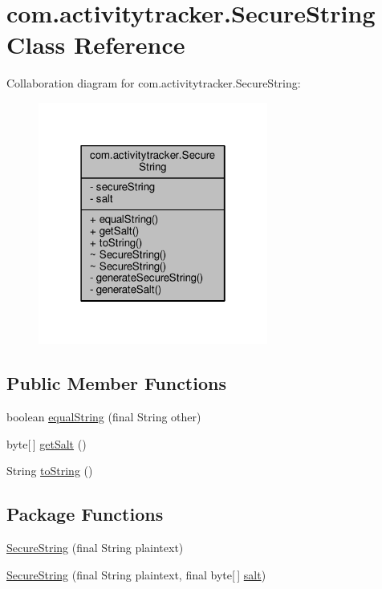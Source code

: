 \hypertarget{classcom_1_1activitytracker_1_1_secure_string}{}\section{com.\+activitytracker.\+Secure\+String Class Reference}
\label{classcom_1_1activitytracker_1_1_secure_string}


Collaboration diagram for com.\+activitytracker.\+Secure\+String\+:
\nopagebreak
\begin{figure}[H]
\begin{center}
\leavevmode
\includegraphics[width=214pt]{classcom_1_1activitytracker_1_1_secure_string__coll__graph}
\end{center}
\end{figure}
\subsection*{Public Member Functions}
\begin{DoxyCompactItemize}
\item 
boolean \hyperlink{classcom_1_1activitytracker_1_1_secure_string_a8b5c3cac74b22ff0eb3c43a7ebd980f5}{equal\+String} (final String other)
\item 
byte\mbox{[}$\,$\mbox{]} \hyperlink{classcom_1_1activitytracker_1_1_secure_string_ab5369653852da122aba874f35cbda9a5}{get\+Salt} ()
\item 
String \hyperlink{classcom_1_1activitytracker_1_1_secure_string_aef531e12618c5c147adc52fda0d4add8}{to\+String} ()
\end{DoxyCompactItemize}
\subsection*{Package Functions}
\begin{DoxyCompactItemize}
\item 
\hyperlink{classcom_1_1activitytracker_1_1_secure_string_a889fcbf0c1f771962ac81886f49e389e}{Secure\+String} (final String plaintext)
\item 
\hyperlink{classcom_1_1activitytracker_1_1_secure_string_a04c2f0677ecd9af147428976a11c85e2}{Secure\+String} (final String plaintext, final byte\mbox{[}$\,$\mbox{]} \hyperlink{classcom_1_1activitytracker_1_1_secure_string_a8549ead1f186ff0c2520818b03d1cc21}{salt})
\end{DoxyCompactItemize}
